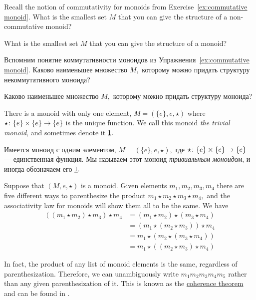 \documentclass[../main/CT4S-EN-RU]{subfiles}
\begin{document}
\begin{exerciseENG}
Recall the notion of commutativity for monoids from Exercise~\ref{ex:commutative monoid}.
\sexc What is the smallest set $M$ that you can give the structure of a non-commutative monoid?
\item What is the smallest set $M$ that you can give the structure of a monoid?
\endsexc
\end{exerciseENG}

\begin{exerciseRUS}
Вспомним понятие коммутативности моноидов из Упражнения~\ref{ex:commutative monoid}.
\sexc Каково наименьшее множество $M,$ которому можно придать структуру некоммутативного моноида?
\item Каково наименьшее множество $M,$ которому можно придать структуру моноида?
\endsexc
\end{exerciseRUS}

\begin{exampleENG}\label{ex:trivial monoid}
There is a monoid with only one element, $M=(\{e\},e,\star)$ where $\star\colon\{e\}\times\{e\}\rightarrow\{e\}$ is the unique function. We call this monoid {\em the trivial monoid}, and sometimes denote it $\underline{1}.$
\end{exampleENG}

\begin{exampleRUS}\label{ex:trivial monoid}
Имеется моноид с одним элементом, $M=(\{e\},e,\star),$ где $\star\colon\{e\}\times\{e\}\rightarrow\{e\}$ — единственная функция. Мы называем этот моноид {\em тривиальным моноидом}, и иногда обозначаем его $\underline{1}.$
\end{exampleRUS}

\begin{exampleENG}
Suppose that $(M,e,\star)$ is a monoid. Given elements $m_1,m_2,m_3,m_4$ there are five different ways to parenthesize the product $m_1\star m_2\star m_3\star m_4,$ and the associativity law for monoids will show them all to be the same. We have
\begin{align*}
((m_1\star m_2)\star m_3)\star m_4&=(m_1\star m_2)\star (m_3\star m_4)\\
&=(m_1\star(m_2\star m_3))\star m_4\\
&=m_1\star(m_2\star (m_3\star m_4))\\
&=m_1\star((m_2\star m_3)\star m_4)
\end{align*}

In fact, the product of any list of monoid elements is the same, regardless of parenthesization. Therefore, we can unambiguously write $m_1m_2m_3m_4m_5$ rather than any given parenthesization of it. This is known as the \href{http://en.wikipedia.org/wiki/Coherence_theorem}{\text coherence theorem} and can be found in \cite{Mac}.
\end{exampleENG}
\end{document}

